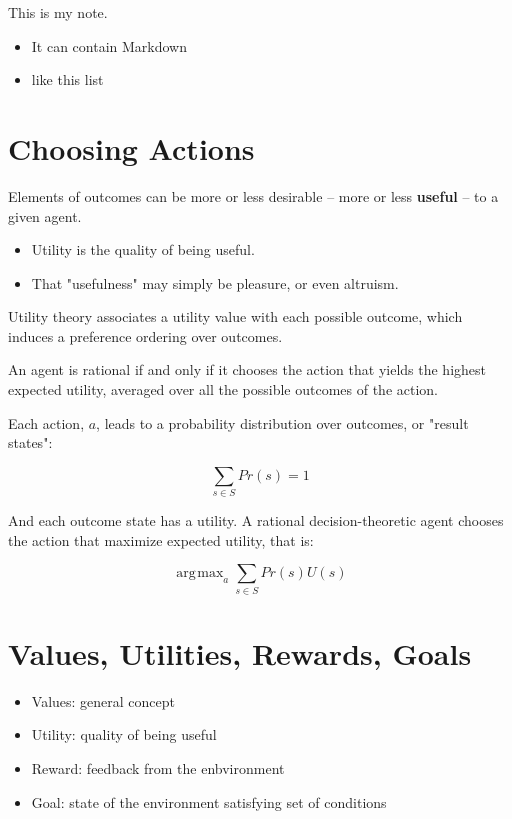 \documentclass[11pt]{article}
\renewenvironment{quote}{\begin{shaded*}\begin{oldquote}}{\end{oldquote}\end{shaded*}}
\DeclareMathOperator*{\argmax}{arg\!max}
\begin{document}
This is my note.

\begin{itemize}
\item It can contain Markdown
\item like this list
\end{itemize}
\section{Choosing Actions}
\label{sec:org13bfd7f}

Elements of outcomes can be more or less desirable -- more or less \textbf{useful} -- to a given agent.

\begin{itemize}
\item Utility is the quality of being useful.
\item That "usefulness" may simply be pleasure, or even altruism.
\end{itemize}

Utility theory associates a utility value with each possible outcome, which induces a preference ordering over outcomes.

\begin{quote}
An agent is rational if and only if it chooses the action that yields the highest expected utility, averaged over all the possible outcomes of the action.
\end{quote}

Each action, \(a\), leads to a probability distribution over outcomes, or "result states":

$$
\sum_{s \in S} Pr(s) = 1
$$

And each outcome state has a utility.  A rational decision-theoretic agent chooses the action that maximize expected utility, that is:

$$
\argmax_{a} \sum_{s \in S} Pr(s) U(s)
$$
\section{Values, Utilities, Rewards, Goals}
\label{sec:org92d7441}

\begin{itemize}
\item Values: general concept
\item Utility: quality of being useful
\item Reward: feedback from the enbvironment
\item Goal: state of the environment satisfying set of conditions
\end{itemize}
\end{document}
